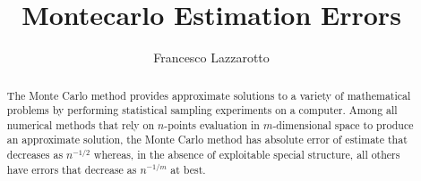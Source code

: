 \documentclass[a4paper,11pt]{article}
\title{Montecarlo Estimation Errors}
\author{Francesco Lazzarotto}
\begin{document}
\maketitle
\begin{abstract}
The Monte Carlo method provides approximate
solutions to a variety of mathematical problems by performing statistical sampling experiments on a computer. Among all numerical methods that rely on $n$-points evaluation in $m$-dimensional space to produce an approximate solution, the Monte Carlo method has absolute error of estimate that decreases as $n^{-1/2}$ whereas,
in the absence of exploitable special structure, all others
have errors that decrease as $n^{-1/m}$ at best.
\end{abstract}

\end{document}
